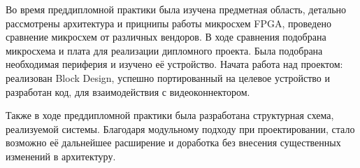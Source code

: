 
Во время преддипломной практики была изучена предметная область, детально
рассмотрены архитектура и прицнипы работы микросхем FPGA, проведено сравнение
микросхем от различных вендоров. В ходе сравнения подобрана микросхема и плата
для реализации дипломного проекта. Была подобрана необходимая периферия и
изучено её устройство. Начата работа над проектом: реализован Block Design,
успешно портированный на целевое устройство и разработан код, для взаимодействия
с видеоконнектором.

Также в ходе преддипломной практики была разработана структурная схема, реализуемой
системы. Благодаря модульному подходу при проектировании, стало возможно её
дальнейшее расширение и доработка без внесения существенных изменений в архитектуру.